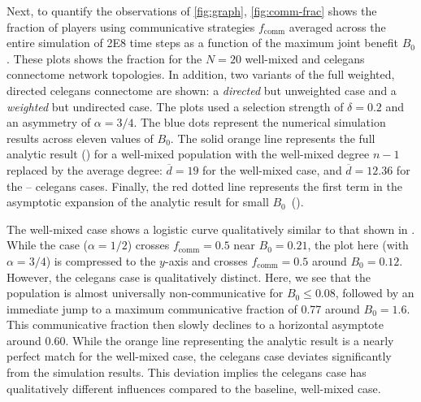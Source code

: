 \documentclass[pdflatex,lineno,referee,sn-mathphys-ay]{sn-jnl}
\begin{document}
Next, to quantify the observations of \cref{fig:graph},
\cref{fig:comm-frac} shows the fraction of players
using communicative strategies $f_{\text{comm}}$ averaged across
the entire simulation of \num{2E8} time steps as a function
of the maximum joint benefit $B_0$.
These plots shows the fraction for the
$N=20$ well-mixed and
\gls{celegans} connectome network topologies.
In addition, two variants of the full weighted, directed \gls{celegans}
connectome are shown:
a  \emph{directed} but unweighted case
and
a  \emph{weighted} but undirected case.
The plots used a selection strength of $\delta=0.2$
and an asymmetry of $\alpha=3/4$.
The blue dots represent the numerical simulation results across eleven
values of $B_0$.
The solid orange line represents the full analytic
result () for a well-mixed population
with the well-mixed degree $n-1$ replaced by the average
degree: $\overline{d} = \num{19}$
for the  well-mixed case,
and $\overline{d} = \num{12.36}$ for the
--
\gls{celegans} cases.
Finally, the red dotted line represents the first term
in the asymptotic expansion
of the analytic result for small $B_0$~().

The  well-mixed case shows a logistic curve
qualitatively similar to that shown in \citet{tripp2022evolutionary}.
While the \citet{tripp2022evolutionary} case ($\alpha = 1/2$)
crosses $f_{\text{comm}} = 0.5$ near $B_0 = 0.21$,
the plot here (with $\alpha = 3/4$) is compressed to the $y$-axis
and crosses $f_{\text{comm}} = 0.5$ around $B_0 = 0.12$.
However, the  \gls{celegans} case
is qualitatively distinct.
Here, we see that the population is almost universally non-communicative
for $B_0 \le 0.08$,
followed by an immediate jump to a maximum communicative fraction
of \num{0.77} around $B_0 = 1.6$.
This communicative fraction then slowly declines
to a horizontal asymptote around \num{0.60}.
While the orange line representing the analytic result
is a nearly perfect match for the  well-mixed case,
the  \gls{celegans} case deviates significantly
from the simulation results.
This deviation implies the \gls{celegans} case
has qualitatively different influences compared to the baseline, well-mixed case.
\end{document}
